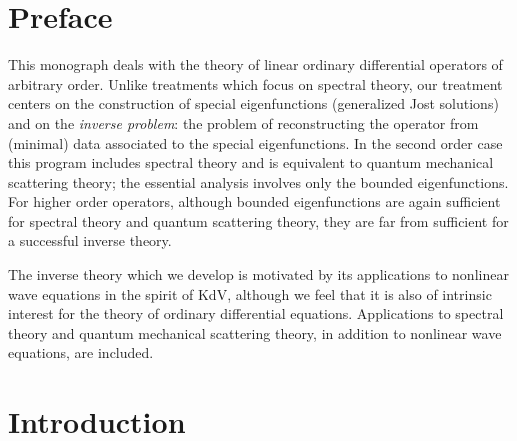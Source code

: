 \documentclass{surv-l}
\theoremstyle{plain}
\theoremstyle{definition}
\numberwithin{equation}{chapter}
\begin{document}
\frontmatter



\tableofcontents

\frontmatter

\chapter*{Preface}
This monograph deals with the theory of linear ordinary differential operators of arbitrary order. Unlike treatments which focus on spectral theory, our treatment centers on the construction of special eigenfunctions (generalized Jost solutions) and on the \emph{inverse problem}: the problem of reconstructing the operator from (minimal) data associated to the special eigenfunctions. In the second order case this program includes spectral theory and is equivalent to quantum mechanical scattering theory; the essential analysis involves only the bounded eigenfunctions. For higher order operators, although bounded eigenfunctions are again sufficient for spectral theory and quantum scattering theory, they are far from sufficient for a successful inverse theory.

The inverse theory which we develop is motivated by its applications to nonlinear wave equations in the spirit of KdV, although we feel that it is also of intrinsic interest for the theory of ordinary differential equations. Applications to spectral theory and quantum mechanical scattering theory, in addition to nonlinear wave equations, are included.

\mainmatter
\chapter*{Introduction}
\end{document}
